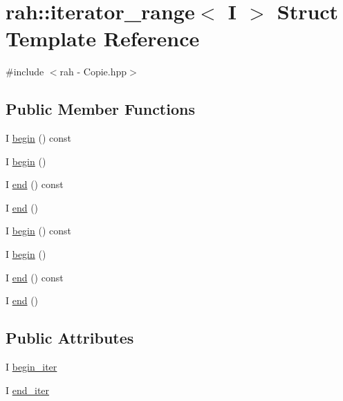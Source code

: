\hypertarget{structrah_1_1iterator__range}{}\section{rah\+::iterator\+\_\+range$<$ I $>$ Struct Template Reference}
\label{structrah_1_1iterator__range}


{\ttfamily \#include $<$rah -\/ Copie.\+hpp$>$}

\subsection*{Public Member Functions}
\begin{DoxyCompactItemize}
\item 
I \mbox{\hyperlink{structrah_1_1iterator__range_a8e9c129ae0443c763ec87748add1b8fa}{begin}} () const
\item 
I \mbox{\hyperlink{structrah_1_1iterator__range_a1281848b740db43274f5be412c1a83f4}{begin}} ()
\item 
I \mbox{\hyperlink{structrah_1_1iterator__range_a8945eefba8353b52d0eaa97491d00ab3}{end}} () const
\item 
I \mbox{\hyperlink{structrah_1_1iterator__range_af0aabf4f87c49cc40e9877cbb296a926}{end}} ()
\item 
I \mbox{\hyperlink{structrah_1_1iterator__range_a8e9c129ae0443c763ec87748add1b8fa}{begin}} () const
\item 
I \mbox{\hyperlink{structrah_1_1iterator__range_a1281848b740db43274f5be412c1a83f4}{begin}} ()
\item 
I \mbox{\hyperlink{structrah_1_1iterator__range_a8945eefba8353b52d0eaa97491d00ab3}{end}} () const
\item 
I \mbox{\hyperlink{structrah_1_1iterator__range_af0aabf4f87c49cc40e9877cbb296a926}{end}} ()
\end{DoxyCompactItemize}
\subsection*{Public Attributes}
\begin{DoxyCompactItemize}
\item 
I \mbox{\hyperlink{structrah_1_1iterator__range_a7c1da45d5ed07caead073472776cf298}{begin\+\_\+iter}}
\item 
I \mbox{\hyperlink{structrah_1_1iterator__range_aa9bfeef57b703dbdd5444afb426db863}{end\+\_\+iter}}
\end{DoxyCompactItemize}


